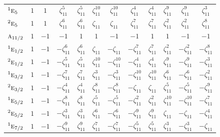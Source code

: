 \documentclass[10pt,a4paper]{article}
\makeatletter
\def\grouprule#1#2{\noalign{\marks\LTgroupmarks{\the\belowrulesep}\nobreak\vskip#1%
  \vskip\aboverulesep}\multispan\LT@cols\unskip{\leaders\hrule\@height#2\hfill\kern\z@}\cr
  \noalign{\penalty\LTrulebreak\vskip\belowrulesep\global\@lastruleclass\z@}}
\numberwithin{equation}{section}
\newcommand{\irr}[1]{\text{\normalfont\scshape #1}}
\newcommand{\conjpair}[1]{{}^{#1}}
\newcommand{\rootunity}[1]{\zeta_{#1}}
\makeatother
\begin{document}
{\begin{longtable}{@{}lccccccccccc@{}}
$\conjpair{1}\irr{e}_{5}$ & $1$ & $1$ & $\rootunity{11}^{5}$ & $\rootunity{11}^{5}$ & $\rootunity{11}^{10}$ & $\rootunity{11}^{10}$ & $\rootunity{11}^{4}$ & $\rootunity{11}^{4}$ & $\rootunity{11}^{9}$ & $\rootunity{11}^{9}$ & $\rootunity{11}^{3}$\\
$\conjpair{2}\irr{e}_{5}$ & $1$ & $1$ & $\rootunity{11}^{6}$ & $\rootunity{11}^{6}$ & $\rootunity{11}$ & $\rootunity{11}$ & $\rootunity{11}^{7}$ & $\rootunity{11}^{7}$ & $\rootunity{11}^{2}$ & $\rootunity{11}^{2}$ & $\rootunity{11}^{8}$\\
\grouprule{0pt}{\lightrulewidth}
$\irr{a}_{11/2}$ & $1$ & $-1$ & $-1$ & $1$ & $1$ & $-1$ & $-1$ & $1$ & $1$ & $-1$ & $-1$\\
$\conjpair{1}\irr{e}_{1/2}$ & $1$ & $-1$ & $-\rootunity{11}^{6}$ & $\rootunity{11}^{6}$ & $\rootunity{11}$ & $-\rootunity{11}$ & $-\rootunity{11}^{7}$ & $\rootunity{11}^{7}$ & $\rootunity{11}^{2}$ & $-\rootunity{11}^{2}$ & $-\rootunity{11}^{8}$\\
$\conjpair{2}\irr{e}_{1/2}$ & $1$ & $-1$ & $-\rootunity{11}^{5}$ & $\rootunity{11}^{5}$ & $\rootunity{11}^{10}$ & $-\rootunity{11}^{10}$ & $-\rootunity{11}^{4}$ & $\rootunity{11}^{4}$ & $\rootunity{11}^{9}$ & $-\rootunity{11}^{9}$ & $-\rootunity{11}^{3}$\\
$\conjpair{1}\irr{e}_{3/2}$ & $1$ & $-1$ & $-\rootunity{11}^{7}$ & $\rootunity{11}^{7}$ & $\rootunity{11}^{3}$ & $-\rootunity{11}^{3}$ & $-\rootunity{11}^{10}$ & $\rootunity{11}^{10}$ & $\rootunity{11}^{6}$ & $-\rootunity{11}^{6}$ & $-\rootunity{11}^{2}$\\
$\conjpair{2}\irr{e}_{3/2}$ & $1$ & $-1$ & $-\rootunity{11}^{4}$ & $\rootunity{11}^{4}$ & $\rootunity{11}^{8}$ & $-\rootunity{11}^{8}$ & $-\rootunity{11}$ & $\rootunity{11}$ & $\rootunity{11}^{5}$ & $-\rootunity{11}^{5}$ & $-\rootunity{11}^{9}$\\
$\conjpair{1}\irr{e}_{5/2}$ & $1$ & $-1$ & $-\rootunity{11}^{8}$ & $\rootunity{11}^{8}$ & $\rootunity{11}^{5}$ & $-\rootunity{11}^{5}$ & $-\rootunity{11}^{2}$ & $\rootunity{11}^{2}$ & $\rootunity{11}^{10}$ & $-\rootunity{11}^{10}$ & $-\rootunity{11}^{7}$\\
$\conjpair{2}\irr{e}_{5/2}$ & $1$ & $-1$ & $-\rootunity{11}^{3}$ & $\rootunity{11}^{3}$ & $\rootunity{11}^{6}$ & $-\rootunity{11}^{6}$ & $-\rootunity{11}^{9}$ & $\rootunity{11}^{9}$ & $\rootunity{11}$ & $-\rootunity{11}$ & $-\rootunity{11}^{4}$\\
$\conjpair{1}\irr{e}_{7/2}$ & $1$ & $-1$ & $-\rootunity{11}^{9}$ & $\rootunity{11}^{9}$ & $\rootunity{11}^{7}$ & $-\rootunity{11}^{7}$ & $-\rootunity{11}^{5}$ & $\rootunity{11}^{5}$ & $\rootunity{11}^{3}$ & $-\rootunity{11}^{3}$ & $-\rootunity{11}$\\

\end{longtable}}
\end{document}
